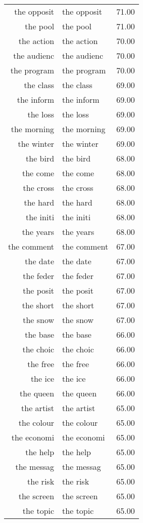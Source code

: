 \begin{table}[ht]
\begin{tabular}{rlr}
  the opposit & the opposit & 71.00 \\ 
  the pool & the pool & 71.00 \\ 
  the action & the action & 70.00 \\ 
  the audienc & the audienc & 70.00 \\ 
  the program & the program & 70.00 \\ 
  the class & the class & 69.00 \\ 
  the inform & the inform & 69.00 \\ 
  the loss & the loss & 69.00 \\ 
  the morning & the morning & 69.00 \\ 
  the winter & the winter & 69.00 \\ 
  the bird & the bird & 68.00 \\ 
  the come & the come & 68.00 \\ 
  the cross & the cross & 68.00 \\ 
  the hard & the hard & 68.00 \\ 
  the initi & the initi & 68.00 \\ 
  the years & the years & 68.00 \\ 
  the comment & the comment & 67.00 \\ 
  the date & the date & 67.00 \\ 
  the feder & the feder & 67.00 \\ 
  the posit & the posit & 67.00 \\ 
  the short & the short & 67.00 \\ 
  the snow & the snow & 67.00 \\ 
  the base & the base & 66.00 \\ 
  the choic & the choic & 66.00 \\ 
  the free & the free & 66.00 \\ 
  the ice & the ice & 66.00 \\ 
  the queen & the queen & 66.00 \\ 
  the artist & the artist & 65.00 \\ 
  the colour & the colour & 65.00 \\ 
  the economi & the economi & 65.00 \\ 
  the help & the help & 65.00 \\ 
  the messag & the messag & 65.00 \\ 
  the risk & the risk & 65.00 \\ 
  the screen & the screen & 65.00 \\ 
  the topic & the topic & 65.00 \\ 

\end{tabular}
\end{table}
